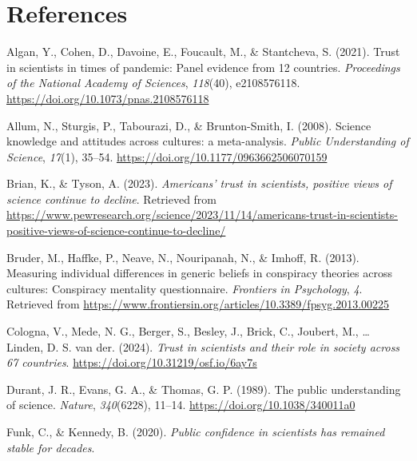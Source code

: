 \documentclass[
  doc,floatsintext]{apa6}
\newlength{\cslhangindent}
\newenvironment{CSLReferences}[2] %
 {\begin{list}{}{%
  \setlength{\itemindent}{0pt}
  \setlength{\leftmargin}{0pt}
  \setlength{\parsep}{0pt}
  \ifodd #1
   \setlength{\leftmargin}{\cslhangindent}
   \setlength{\itemindent}{-1\cslhangindent}
  \fi
  \setlength{\itemsep}{#2\baselineskip}}}
 {\end{list}}
\begin{document}
\FloatBarrier

\section{References}\label{references}

\label{refs}
\begin{CSLReferences}{1}{0}
Algan, Y., Cohen, D., Davoine, E., Foucault, M., \& Stantcheva, S. (2021). Trust in scientists in times of pandemic: Panel evidence from 12 countries. \emph{Proceedings of the National Academy of Sciences}, \emph{118}(40), e2108576118. \url{https://doi.org/10.1073/pnas.2108576118}

Allum, N., Sturgis, P., Tabourazi, D., \& Brunton-Smith, I. (2008). Science knowledge and attitudes across cultures: a meta-analysis. \emph{Public Understanding of Science}, \emph{17}(1), 35--54. \url{https://doi.org/10.1177/0963662506070159}

Brian, K., \& Tyson, A. (2023). \emph{Americans{'} trust in scientists, positive views of science continue to decline}. Retrieved from \url{https://www.pewresearch.org/science/2023/11/14/americans-trust-in-scientists-positive-views-of-science-continue-to-decline/}

Bruder, M., Haffke, P., Neave, N., Nouripanah, N., \& Imhoff, R. (2013). Measuring individual differences in generic beliefs in conspiracy theories across cultures: Conspiracy mentality questionnaire. \emph{Frontiers in Psychology}, \emph{4}. Retrieved from \url{https://www.frontiersin.org/articles/10.3389/fpsyg.2013.00225}

Cologna, V., Mede, N. G., Berger, S., Besley, J., Brick, C., Joubert, M., \ldots{} Linden, D. S. van der. (2024). \emph{Trust in scientists and their role in society across 67 countries}. \url{https://doi.org/10.31219/osf.io/6ay7s}

Durant, J. R., Evans, G. A., \& Thomas, G. P. (1989). The public understanding of science. \emph{Nature}, \emph{340}(6228), 11--14. \url{https://doi.org/10.1038/340011a0}

Funk, C., \& Kennedy, B. (2020). \emph{Public confidence in scientists has remained stable for decades}.


\end{CSLReferences}
\end{document}
